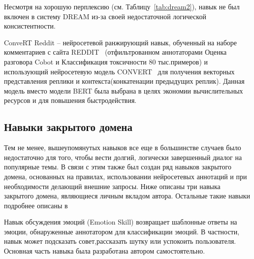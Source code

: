 Несмотря на хорошую перплексию (см. Таблицу~\ref{tab:dream2}), навык не был включен в систему {DREAM} из-за своей недостаточной логической консистентности.


\begin{table}[htbp]
\centering
\caption {Точность (перплексия) для генеративного навыка.}
\label{tab:dream2}%
\end{table}



ConveRT Reddit -- нейросетевой ранжирующий навык, обученный на наборе комментариев с сайта REDDIT~\cite{na_website_ndu} (отфильтрованном аннотаторами Оценка разговора Cobot и Классификация токсичности 80 тыс.примеров) и использующий нейросетевую модель CONVERT~\cite{henderson_2019} для получения векторных представления реплики и контекста(конкатенации предыдущих реплик). Данная модель вместо модели BERT была выбрана в целях экономии вычислительных ресурсов и для повышения быстродействия.

\subsection{Навыки закрытого домена}\label{dream:1:closed}

Тем не менее, вышеупомянутых навыков все еще в большинстве случаев было недостаточно для того, чтобы вести долгий, логически завершенный диалог на популярные темы. В связи с этим также был создан ряд навыков закрытого домена, основанных на правилах, использовании нейросетевых аннотаций и при необходимости делающий внешние запросы. Ниже описаны три навыка закрытого домена, являющиеся личным вкладом автора. Остальные такие навыки подробнее описаны в~\cite{dream1,dream1_trudy}

Навык обсуждения эмоций (Emotion Skill) возвращает шаблонные ответы на эмоции, обнаруженные аннотатором для классификации эмоций. В частности, навык может подсказать совет,рассказать шутку или успокоить пользователя. Основная часть навыка была разработана автором самостоятельно.

